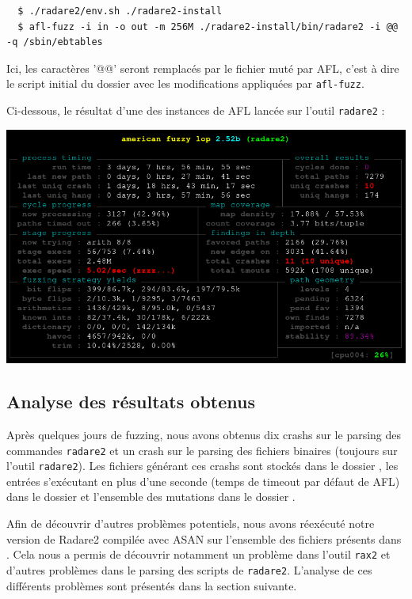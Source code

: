 \begin{lstlisting}
  $ ./radare2/env.sh ./radare2-install
  $ afl-fuzz -i in -o out -m 256M ./radare2-install/bin/radare2 -i @@ -q /sbin/ebtables
\end{lstlisting}

Ici, les caractères '@@' seront remplacés par le fichier muté par AFL, c'est à dire le script initial du dossier  avec les modifications appliquées par \lstinline{afl-fuzz}.

Ci-dessous, le résultat d'une des instances de AFL lancée sur l'outil \lstinline{radare2} :

\includegraphics[width=0.9\linewidth]{../medias/afl-fuzz.png}

\subsection{Analyse des résultats obtenus}

Après quelques jours de fuzzing, nous avons obtenus dix crashs sur le parsing des commandes \lstinline{radare2} et un crash sur le parsing des fichiers binaires (toujours sur l'outil \lstinline{radare2}).
Les fichiers générant ces crashs sont stockés dans le dossier , les entrées s'exécutant en plus d'une seconde (temps de timeout par défaut de AFL) dans le dossier  et l'ensemble des mutations dans le dossier .

Afin de découvrir d'autres problèmes potentiels, nous avons réexécuté notre version de Radare2 compilée avec ASAN sur l'ensemble des fichiers présents dans .
Cela nous a permis de découvrir notamment un problème dans l'outil \lstinline{rax2} et d'autres problèmes dans le parsing des scripts de \lstinline{radare2}.
L'analyse de ces différents problèmes sont présentés dans la section suivante.


